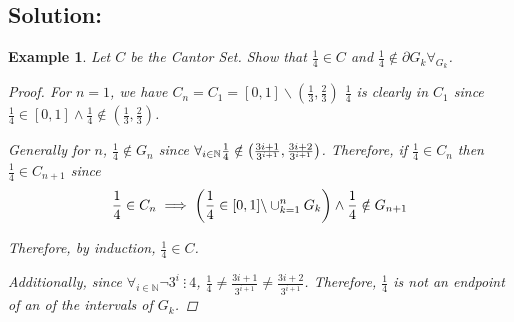 \documentclass[]{article}
\newcommand{\N}{\mathbb{N}}
\newcommand{\divisible}{ \ \vdots \ }
\newtheorem{example}{Example}
\begin{document}
\subsection*{Solution:}
\begin{example}
    Let $C$ be the Cantor Set. 
    Show that $\frac{1}{4} \in C$ and $\frac{1}{4} \notin \partial G_k \forall_{G_k}$.
    \begin{proof}
        For $n=1$, we have $C_n = C_1 = [0,1] \backslash (\frac{1}{3}, \frac{2}{3})$
        $\frac{1}{4}$ is clearly in $C_1$ since $\frac{1}{4} \in [0,1] \land \frac{1}{4} \notin (\frac{1}{3}, \frac{2}{3})$.
        
        Generally for $n$, $\frac{1}{4} \notin G_n$ since $\forall_{i \in \N} \frac{1}{4} \notin \qty(\frac{3i+1}{3^{i+1}}, \frac{3i + 2}{3^{i+1}})$. 
        Therefore, if $\frac{1}{4} \in C_n$ then $\frac{1}{4} \in C_{n+1}$ since \[
            \frac{1}{4} \in C_n 
            \implies \qty(\frac{1}{4} \in [0,1] \backslash \cup_{k=1}^{n} G_k) 
            \land \frac{1}{4} \notin G_{n+1}
        \]

        Therefore, by induction, $\frac{1}{4} \in C$.

        Additionally, since $\forall_{i \in \N} \lnot 3^{i} \divisible 4$, $\frac{1}{4} \neq \frac{3i + 1}{3^{i+1}} \neq \frac{3i+2}{3^{i+1}}$.
        Therefore, $\frac{1}{4}$ is not an endpoint of an of the intervals of $G_k$.
    \end{proof}
\end{example}
\end{document}
